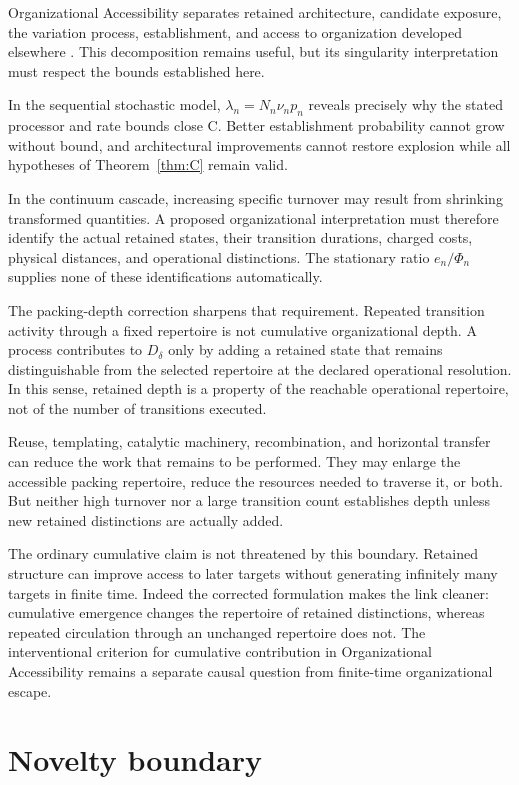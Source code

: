 \documentclass[11pt,a4paper]{article}
\theoremstyle{definition}
\numberwithin{equation}{section}
\begin{document}
Organizational Accessibility separates retained architecture,
candidate exposure, the variation process, establishment, and
access to organization developed elsewhere \cite{OA8}.
This decomposition remains useful, but its singularity
interpretation must respect the bounds established here.

In the sequential stochastic model,
$\lambda_n=N_n\nu_np_n$ reveals precisely why the stated processor
and rate bounds close C. Better establishment probability cannot
grow without bound, and architectural improvements cannot restore
explosion while all hypotheses of Theorem~\ref{thm:C} remain valid.

In the continuum cascade, increasing specific turnover may
result from shrinking transformed quantities. A proposed
organizational interpretation must therefore identify the
actual retained states, their transition durations, charged
costs, physical distances, and operational distinctions.
The stationary ratio $e_n/\Phi_n$ supplies none of these
identifications automatically.

The packing-depth correction sharpens that requirement. Repeated transition
activity through a fixed repertoire is not cumulative organizational depth.
A process contributes to $D_\delta$ only by adding a retained state that
remains distinguishable from the selected repertoire at the declared
operational resolution. In this sense, retained depth is a property of the
reachable operational repertoire, not of the number of transitions executed.

Reuse, templating, catalytic machinery, recombination, and
horizontal transfer can reduce the work that remains to be
performed. They may enlarge the accessible packing repertoire, reduce the
resources needed to traverse it, or both. But neither high turnover nor a
large transition count establishes depth unless new retained distinctions
are actually added.

The ordinary cumulative claim is not threatened by this boundary. Retained
structure can improve access to later targets without generating infinitely
many targets in finite time. Indeed the corrected formulation makes the link
cleaner: cumulative emergence changes the repertoire of retained distinctions,
whereas repeated circulation through an unchanged repertoire does not.
The interventional criterion for cumulative contribution in Organizational
Accessibility remains a separate causal question from finite-time
organizational escape.

\section{Novelty boundary}
\end{document}
